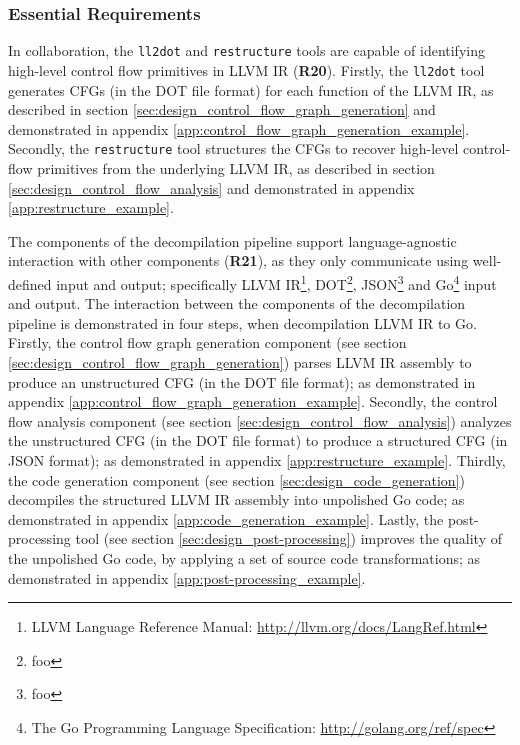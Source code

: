
\subsubsection{Essential Requirements}
\label{sec:eval_control_flow_analysis_tool_essential_requirements}


In collaboration, the \texttt{ll2dot} and \texttt{restructure} tools are capable of identifying high-level control flow primitives in LLVM IR (\textbf{R20}). Firstly, the \texttt{ll2dot} tool generates CFGs (in the DOT file format) for each function of the LLVM IR, as described in section \ref{sec:design_control_flow_graph_generation} and demonstrated in appendix \ref{app:control_flow_graph_generation_example}. Secondly, the \texttt{restructure} tool structures the CFGs to recover high-level control-flow primitives from the underlying LLVM IR, as described in section \ref{sec:design_control_flow_analysis} and demonstrated in appendix \ref{app:restructure_example}.



The components of the decompilation pipeline support language-agnostic interaction with other components (\textbf{R21}), as they only communicate using well-defined input and output; specifically LLVM IR\footnote{LLVM Language Reference Manual: \url{http://llvm.org/docs/LangRef.html}}, DOT\footnote{foo}, JSON\footnote{foo} and Go\footnote{The Go Programming Language Specification: \url{http://golang.org/ref/spec}} input and output. The interaction between the components of the decompilation pipeline is demonstrated in four steps, when decompilation LLVM IR to Go. Firstly, the control flow graph generation component (see section \ref{sec:design_control_flow_graph_generation}) parses LLVM IR assembly to produce an unstructured CFG (in the DOT file format); as demonstrated in appendix \ref{app:control_flow_graph_generation_example}. Secondly, the control flow analysis component (see section \ref{sec:design_control_flow_analysis}) analyzes the unstructured CFG (in the DOT file format) to produce a structured CFG (in JSON format); as demonstrated in appendix \ref{app:restructure_example}. Thirdly, the code generation component (see section \ref{sec:design_code_generation}) decompiles the structured LLVM IR assembly into unpolished Go code; as demonstrated in appendix \ref{app:code_generation_example}. Lastly, the post-processing tool (see section \ref{sec:design_post-processing}) improves the quality of the unpolished Go code, by applying a set of source code transformations; as demonstrated in appendix \ref{app:post-processing_example}.
